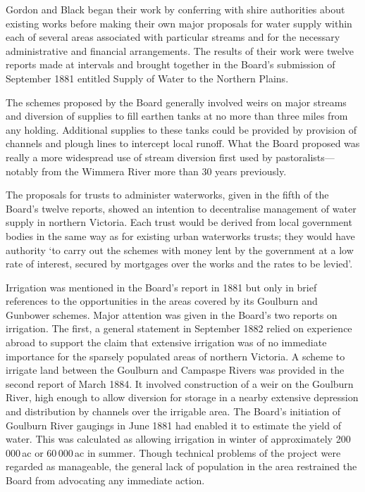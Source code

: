 Gordon and Black began their work by conferring with shire authorities
about existing works before making their own major proposals for water
supply within each of several areas associated with particular streams
and for the necessary administrative and financial arrangements.  The
results of their work were twelve reports made at intervals and
brought together in the Board's submission of September 1881 entitled
Supply of Water to the Northern Plains.

The schemes proposed by the Board generally involved weirs on major
streams and diversion of supplies to fill earthen tanks at no more
than three miles from any holding.
Additional supplies to these tanks could be provided by provision of
channels and plough lines to intercept local runoff.  What the Board
proposed was really a more widespread use of stream diversion first
used by pastoralists---notably from the Wimmera River more than 30
years previously.

The proposals for trusts to administer waterworks, given in the fifth
of the Board's twelve reports, showed an intention to decentralise
management of water supply in northern Victoria.  Each trust would be
derived from local government bodies in the same way as for existing
urban waterworks trusts; they would have authority `to carry out the
schemes with money lent by the government at a low rate of interest,
secured by mortgages over the works and the rates to be
levied'.

Irrigation was mentioned in the Board's report in 1881 but only in
brief references to the opportunities in the areas covered by its
Goulburn and Gunbower schemes.  Major attention was given in the
Board's two reports on irrigation.  The first, a general statement in
September 1882 relied on experience abroad to support the claim that
extensive irrigation was of no immediate importance for the sparsely
populated areas of northern Victoria.  A
scheme to irrigate land between the Goulburn and Campaspe Rivers was
provided in the second report of March 1884.  It involved
construction of a weir on the Goulburn River, high enough to allow
diversion for storage in a nearby extensive depression and
distribution by channels over the irrigable area.  The Board's
initiation of Goulburn River gaugings in June 1881 had enabled it to
estimate the yield of water.  This was calculated as allowing
irrigation in winter of approximately 200\,000\,ac or 60\,000\,ac in
summer.  Though technical problems of the project were regarded as
manageable, the general lack of population in the area restrained the
Board from advocating any immediate action.

